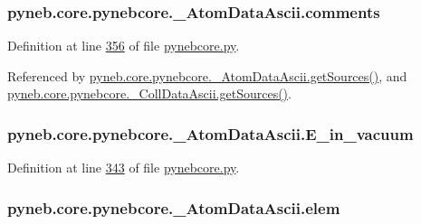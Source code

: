 \hypertarget{classpyneb_1_1core_1_1pynebcore_1_1___atom_data_ascii_a935b1baf76c6450653d1ebb673bc8f08}{
\subsubsection[{comments}]{\setlength{\rightskip}{0pt plus 5cm}pyneb.\-core.\-pynebcore.\-\_\-\-Atom\-Data\-Ascii.\-comments}}\label{classpyneb_1_1core_1_1pynebcore_1_1___atom_data_ascii_a935b1baf76c6450653d1ebb673bc8f08}


Definition at line \hyperlink{pynebcore_8py_source_l00356}{356} of file \hyperlink{pynebcore_8py_source}{pynebcore.\-py}.



Referenced by \hyperlink{pynebcore_8py_source_l00460}{pyneb.\-core.\-pynebcore.\-\_\-\-Atom\-Data\-Ascii.\-get\-Sources()}, and \hyperlink{pynebcore_8py_source_l01022}{pyneb.\-core.\-pynebcore.\-\_\-\-Coll\-Data\-Ascii.\-get\-Sources()}.

\hypertarget{classpyneb_1_1core_1_1pynebcore_1_1___atom_data_ascii_a468f4b6f8f580799b9d4a2a81e79941a}{
\subsubsection[{E\-\_\-in\-\_\-vacuum}]{\setlength{\rightskip}{0pt plus 5cm}pyneb.\-core.\-pynebcore.\-\_\-\-Atom\-Data\-Ascii.\-E\-\_\-in\-\_\-vacuum}}\label{classpyneb_1_1core_1_1pynebcore_1_1___atom_data_ascii_a468f4b6f8f580799b9d4a2a81e79941a}


Definition at line \hyperlink{pynebcore_8py_source_l00343}{343} of file \hyperlink{pynebcore_8py_source}{pynebcore.\-py}.

\hypertarget{classpyneb_1_1core_1_1pynebcore_1_1___atom_data_ascii_a330140eda27048983020488e50c5858a}{
\subsubsection[{elem}]{\setlength{\rightskip}{0pt plus 5cm}pyneb.\-core.\-pynebcore.\-\_\-\-Atom\-Data\-Ascii.\-elem}}\label{classpyneb_1_1core_1_1pynebcore_1_1___atom_data_ascii_a330140eda27048983020488e50c5858a}


